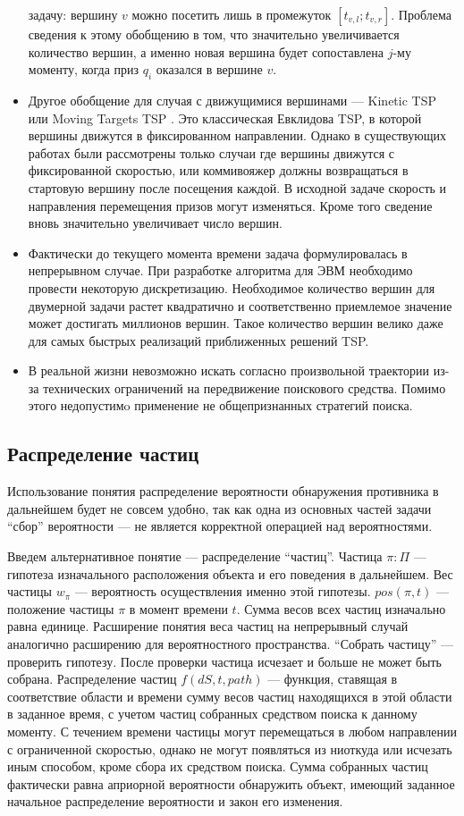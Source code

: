 \begin{itemize}
{задачу: вершину $v$ можно посетить лишь в промежуток $[t_{v,l}; t_{v,r}]$. Проблема сведения к
этому обобщению
в том, что значительно увеличивается количество вершин, а именно новая вершина будет
сопоставлена $j$-му моменту, когда приз $q_i$ оказался в вершине $v$.} 
\item{Другое обобщение для случая с движущимися вершинами --- Kinetic TSP \cite{ham99} или
Moving Targets TSP \cite{hel03}.
Это классическая Евклидова TSP, в которой вершины движутся в фиксированном направлении.
Однако в существующих работах были рассмотрены только случаи где вершины движутся с
фиксированной скоростью, или коммивояжер должны возвращаться в стартовую вершину
 после посещения каждой. В исходной
задаче скорость и направления перемещения призов могут изменяться. Кроме того сведение вновь
значительно увеличивает число вершин.}
\item{Фактически до текущего момента времени задача формулировалась в непрерывном случае.
При разработке алгоритма для ЭВМ необходимо провести некоторую дискретизацию.
Необходимое количество вершин для двумерной задачи растет квадратично и соответственно
приемлемое значение может достигать миллионов вершин. Такое количество вершин велико
даже для самых быстрых реализаций приближенных решений TSP.}
\item{В реальной жизни невозможно искать согласно произвольной траектории из-за технических
ограничений на передвижение поискового средства. Помимо этого недопустимo применение не
общепризнанных стратегий поиска.}
\end{itemize}

\FloatBarrier
\subsection{Распределение частиц}
Использование понятия распределение вероятности обнаружения противника в дальнейшем будет
не совсем удобно, так как одна из основных частей задачи ``сбор'' вероятности --- не является
корректной операцией над вероятностями.

Введем альтернативное понятие --- распределение ``частиц''.
Частица $\pi : \Pi$ --- гипотеза изначального расположения объекта и его поведения в дальнейшем.
Вес частицы $w_{\pi}$ --- вероятность осуществления именно этой гипотезы.
$pos(\pi, t)$ --- положение частицы $\pi$ в момент времени $t$.
Сумма весов всех частиц изначально равна единице. Расширение понятия веса частиц на непрерывный
 случай аналогично расширению для вероятностного пространства.
``Собрать частицу'' --- проверить гипотезу. После проверки частица исчезает и больше не может
быть собрана.
Распределение частиц $f(dS, t, path)$ --- функция, ставящая в соответствие области и
 времени сумму весов частиц находящихся в этой области в заданное время,
 с учетом частиц собранных средством поиска к данному моменту. 
С течением времени частицы могут перемещаться в любом направлении с ограниченной скоростью, однако
не могут появляться из ниоткуда или исчезать иным способом, кроме сбора их средством поиска.
Сумма собранных частиц фактически равна априорной вероятности обнаружить объект, имеющий заданное
начальное распределение вероятности и закон его изменения.

